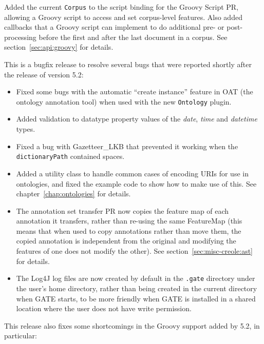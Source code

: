 Added the current {\tt Corpus} to the script binding for the Groovy Script PR,
allowing a Groovy script to access and set corpus-level features.  Also added
callbacks that a Groovy script can implement to do additional pre- or
post-processing before the first and after the last document in a corpus.  See
section~\ref{sec:api:groovy} for details.


This is a bugfix release to resolve several bugs that were reported shortly
after the release of version 5.2:

\begin{itemize}
\item Fixed some bugs with the automatic ``create instance'' feature in OAT
  (the ontology annotation tool) when used with the new {\tt Ontology} plugin.

\item Added validation to datatype property values of the \emph{date},
  \emph{time} and \emph{datetime} types.

\item Fixed a bug with Gazetteer\_LKB that prevented it working when the
  {\tt dictionaryPath} contained spaces.

\item Added a utility class to handle common cases of encoding URIs for use in
  ontologies, and fixed the example code to show how to make use of this.  See
  chapter~\ref{chap:ontologies} for details.

\item The annotation set transfer PR now copies the feature map of each
  annotation it transfers, rather than re-using the same FeatureMap (this means
  that when used to copy annotations rather than move them, the copied
  annotation is independent from the original and modifying the features of one
  does not modify the other).  See section~\ref{sec:misc-creole:ast} for
  details.

\item The Log4J log files are now created by default in the {\tt .gate}
  directory under the user's home directory, rather than being created in the
  current directory when GATE starts, to be more friendly when GATE is
  installed in a shared location where the user does not have write permission.
\end{itemize}

This release also fixes some shortcomings in the Groovy support added by 5.2,
in particular:

